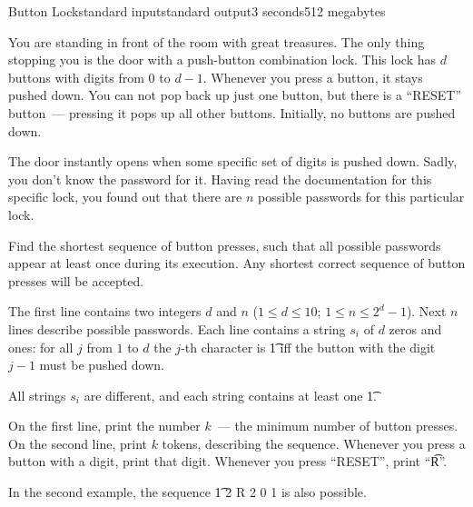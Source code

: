 \begin{problem}{Button Lock}{standard input}{standard output}{3 seconds}{512 megabytes}

You are standing in front of the room with great treasures. The only thing stopping you is the door with a push-button combination lock. This lock has $d$ buttons with digits from $0$ to $d - 1$. Whenever you press a button, it stays pushed down. You can not pop back up just one button, but there is a ``RESET'' button~--- pressing it pops up all other buttons. Initially, no buttons are pushed down.

The door instantly opens when some specific set of digits is pushed down. Sadly, you don't know the password for it. Having read the documentation for this specific lock, you found out that there are $n$ possible passwords for this particular lock.  

Find the shortest sequence of button presses, such that all possible passwords appear at least once during its execution. Any shortest correct sequence of button presses will be accepted.

\InputFile
The first line contains two integers $d$ and $n$ ($1 \le d \le 10$; $1 \le n \le 2^d - 1$).
Next $n$ lines describe possible passwords. Each line contains a string $s_i$ of $d$ zeros and ones: for all $j$ from $1$ to $d$ the $j$-th character is \t{1} iff the button with the digit $j - 1$ must be pushed down.

All strings $s_i$ are different, and each string contains at least one \t{1}.

\OutputFile
On the first line, print the number $k$~--- the minimum number of button presses.
On the second line, print $k$ tokens, describing the sequence. Whenever you press a button with a digit, print that digit. Whenever you press ``RESET'', print ``\t{R}''.

\Examples

\begin{example}
%
%
\end{example}

\Note
In the second example, the sequence \t{1 2 R 2 0 1} is also possible.

\end{problem}

